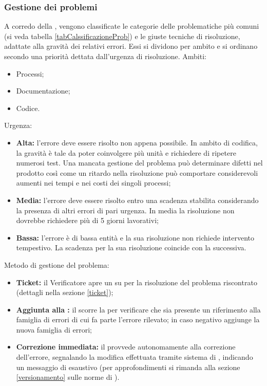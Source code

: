 \documentclass[12pt,a4paper]{article}
\begin{document}
\subsubsection{Gestione dei problemi}
A corredo della , vengono classificate le categorie delle problematiche più comuni (si veda tabella \ref{tabCalssificazioneProb}) e le giuste tecniche di risoluzione, adattate alla gravità dei relativi errori. Essi si dividono per ambito e si ordinano secondo una priorità dettata dall'urgenza di risoluzione. Ambiti:
\begin{itemize}
	\item Processi;
	\item Documentazione;
	\item Codice.
\end{itemize}
Urgenza:
\begin{itemize}
	\item \textbf{Alta:} l'errore deve essere risolto non appena possibile. In ambito di codifica, la gravità è tale da poter coinvolgere più unità e richiedere di ripetere numerosi test. Una mancata gestione del problema può determinare difetti nel prodotto così come un ritardo nella risoluzione può comportare considerevoli aumenti nei tempi e nei costi dei singoli processi;
	\item \textbf{Media:} l'errore deve essere risolto entro una scadenza stabilita considerando la presenza di altri errori di pari urgenza. In media la risoluzione non dovrebbe richiedere più di 5 giorni lavorativi;
	\item \textbf{Bassa:} l'errore è di bassa entità e la sua risoluzione non richiede intervento tempestivo. La scadenza per la sua risoluzione coincide con la  successiva.
\end{itemize}
Metodo di gestione del problema:
\begin{itemize}
	\item \textbf{Ticket:} il Verificatore apre un  su \textit{} per la risoluzione del problema riscontrato (dettagli nella sezione \ref{ticket});
	\item \textbf{Aggiunta alla :} il \VR{} scorre la  per verificare che sia presente un riferimento alla famiglia di errori di cui fa parte l'errore rilevato; in caso negativo aggiunge la nuova famiglia di errori;
	\item \textbf{Correzione immediata:} il \VR{} provvede autonomamente alla correzione dell'errore, segnalando la modifica effettuata tramite sistema di , indicando un messaggio di  esaustivo (per approfondimenti si rimanda alla sezione \ref{versionamento} sulle norme di ).
\end{itemize}
\end{document}
